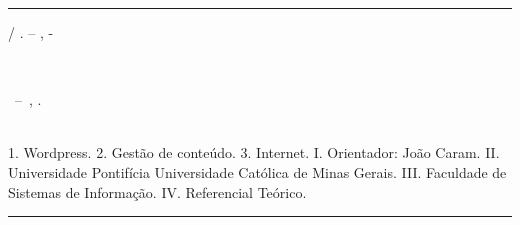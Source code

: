 \documentclass[
	12pt,				%
	openright,			%
	twoside,			%
	a4paper,			%
	Times,
	brazil,				%
	]{abntex2}
\begin{document}
\frenchspacing 


\imprimircapa

\imprimirfolhaderosto*


%
%     
\begin{fichacatalografica}
	\vspace*{\fill}					%
	\hrule							%
	\begin{center}					%
	\begin{minipage}[c]{12.5cm}		%
	
	\imprimirautor
	
	\hspace{0.5cm} \imprimirtitulo  / \imprimirautor. --
	\imprimirlocal, \imprimirdata-
	
	
	\hspace{0.5cm} \imprimirorientadorRotulo~\imprimirorientador\\
	
	\hspace{0.5cm}
	\parbox[t]{\textwidth}{\imprimirtipotrabalho~--~\imprimirinstituicao,
	\imprimirdata.}\\
	
	\hspace{0.5cm}
		1. Wordpress.
		2. Gestão de conteúdo.
		3. Internet.
		I. Orientador:  João Caram.
		II. Universidade Pontifícia Universidade Católica de Minas Gerais.
		III. Faculdade de Sistemas de Informação.
		IV. Referencial Teórico.		
	
	\end{minipage}
	\end{center}
	\hrule
\end{fichacatalografica}
\end{document}
